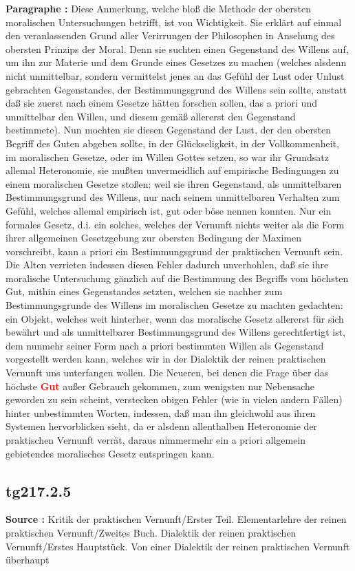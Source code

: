 \documentclass[a4paper,12pt,twoside]{book}
\newcommand{\match}[1]{\textcolor{red}{\textbf{#1}}}
\begin{document}
	\textbf{Paragraphe : }Diese Anmerkung, welche bloß die Methode der obersten moralischen Untersuchungen betrifft, ist von Wichtigkeit. Sie erklärt auf einmal den veranlassenden Grund aller Verirrungen der Philosophen in Ansehung des obersten Prinzips der Moral. Denn sie suchten einen Gegenstand des Willens auf, um ihn zur Materie und dem Grunde eines Gesetzes zu machen (welches alsdenn nicht unmittelbar, sondern vermittelst jenes an das Gefühl der Lust oder Unlust gebrachten Gegenstandes, der Bestimmungsgrund des Willens sein sollte, anstatt daß sie zuerst nach einem Gesetze hätten forschen sollen, das a priori und unmittelbar den Willen, und diesem gemäß allererst den Gegenstand bestimmete). Nun mochten sie diesen Gegenstand der Lust, der den obersten Begriff des Guten abgeben sollte, in der Glückseligkeit, in der Vollkommenheit, im moralischen Gesetze, oder im Willen Gottes setzen, so war ihr Grundsatz allemal Heteronomie, sie mußten unvermeidlich auf empirische Bedingungen zu einem moralischen Gesetze stoßen: weil sie ihren Gegenstand, als unmittelbaren Bestimmungsgrund des Willens, nur nach seinem unmittelbaren Verhalten zum Gefühl, welches allemal empirisch ist, gut oder böse nennen konnten. Nur ein formales Gesetz, d.i. ein solches, welches der Vernunft nichts weiter als die Form ihrer allgemeinen Gesetzgebung zur obersten Bedingung der Maximen vorschreibt, kann a priori ein Bestimmungsgrund der praktischen Vernunft sein. Die Alten verrieten indessen diesen Fehler dadurch unverhohlen, daß sie ihre moralische Untersuchung gänzlich auf die Bestimmung des Begriffs vom höchsten Gut, mithin eines Gegenstandes setzten, welchen sie nachher zum Bestimmungsgrunde des Willens im moralischen  Gesetze zu machten gedachten: ein Objekt, welches weit hinterher, wenn das moralische Gesetz allererst für sich bewährt und als unmittelbarer Bestimmungsgrund des Willens gerechtfertigt ist, dem nunmehr seiner Form nach a priori bestimmten Willen als Gegenstand vorgestellt werden kann, welches wir in der Dialektik der reinen praktischen Vernunft uns unterfangen wollen. Die Neueren, bei denen die Frage über das höchste \match{Gut} außer Gebrauch gekommen, zum wenigsten nur Nebensache geworden zu sein scheint, verstecken obigen Fehler (wie in vielen andern Fällen) hinter unbestimmten Worten, indessen, daß man ihn gleichwohl aus ihren Systemen hervorblicken sieht, da er alsdenn allenthalben Heteronomie der praktischen Vernunft verrät, daraus nimmermehr ein a priori allgemein gebietendes moralisches Gesetz entspringen kann. 
	
	\subsection*{tg217.2.5} 
	\textbf{Source : }Kritik der praktischen Vernunft/Erster Teil. Elementarlehre der reinen praktischen Vernunft/Zweites Buch. Dialektik der reinen praktischen Vernunft/Erstes Hauptstück. Von einer Dialektik der reinen praktischen Vernunft überhaupt\\  
	
\end{document}
